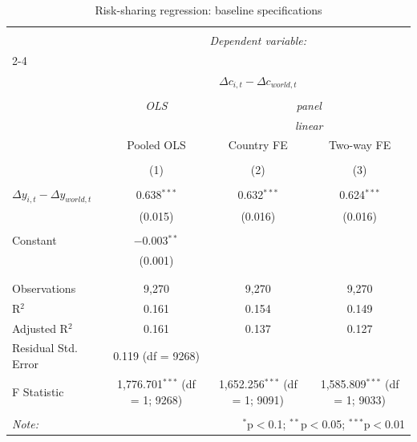 
\begin{table}[!htbp] \centering 
  \caption{Risk-sharing regression: baseline specifications} 
  \label{} 
\begin{tabular}{@{\extracolsep{5pt}}lccc} 
\\[-1.8ex]\hline 
\hline \\[-1.8ex] 
 & \multicolumn{3}{c}{\textit{Dependent variable:}} \\ 
\cline{2-4} 
\\[-1.8ex] & \multicolumn{3}{c}{$\Delta c_{i,t} - \Delta c_{world,t}$} \\ 
\\[-1.8ex] & \textit{OLS} & \multicolumn{2}{c}{\textit{panel}} \\ 
 & \textit{} & \multicolumn{2}{c}{\textit{linear}} \\ 
 & Pooled OLS & Country FE & Two-way FE \\ 
\\[-1.8ex] & (1) & (2) & (3)\\ 
\hline \\[-1.8ex] 
 $\Delta y_{i,t} - \Delta y_{world,t}$ & 0.638$^{***}$ & 0.632$^{***}$ & 0.624$^{***}$ \\ 
  & (0.015) & (0.016) & (0.016) \\ 
  & & & \\ 
 Constant & $-$0.003$^{**}$ &  &  \\ 
  & (0.001) &  &  \\ 
  & & & \\ 
\hline \\[-1.8ex] 
Observations & 9,270 & 9,270 & 9,270 \\ 
R$^{2}$ & 0.161 & 0.154 & 0.149 \\ 
Adjusted R$^{2}$ & 0.161 & 0.137 & 0.127 \\ 
Residual Std. Error & 0.119 (df = 9268) &  &  \\ 
F Statistic & 1,776.701$^{***}$ (df = 1; 9268) & 1,652.256$^{***}$ (df = 1; 9091) & 1,585.809$^{***}$ (df = 1; 9033) \\ 
\hline 
\hline \\[-1.8ex] 
\textit{Note:}  & \multicolumn{3}{r}{$^{*}$p$<$0.1; $^{**}$p$<$0.05; $^{***}$p$<$0.01} \\ 
\end{tabular} 
\end{table} 
